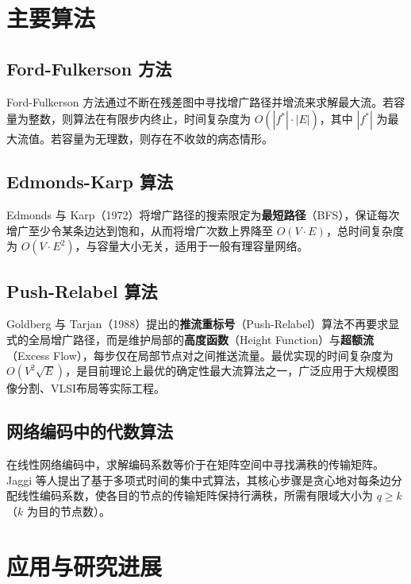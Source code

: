 \documentclass[12pt, a4paper]{article}
\begin{document}
\section{主要算法}

\subsection{Ford-Fulkerson 方法}

Ford-Fulkerson 方法通过不断在残差图中寻找增广路径并增流来求解最大流。若容量为整数，则算法在有限步内终止，时间复杂度为 $O(|f^*|\cdot |E|)$，其中 $|f^*|$ 为最大流值。若容量为无理数，则存在不收敛的病态情形。

\subsection{Edmonds-Karp 算法}

Edmonds 与 Karp（1972）\cite{edmonds1972theoretical}将增广路径的搜索限定为\textbf{最短路径}（BFS），保证每次增广至少令某条边达到饱和，从而将增广次数上界降至 $O(V\cdot E)$，总时间复杂度为 $O(V\cdot E^2)$，与容量大小无关，适用于一般有理容量网络。

\subsection{Push-Relabel 算法}

Goldberg 与 Tarjan（1988）提出的\textbf{推流重标号}（Push-Relabel）算法\cite{goldberg1988new}不再要求显式的全局增广路径，而是维护局部的\textbf{高度函数}（Height Function）与\textbf{超额流}（Excess Flow），每步仅在局部节点对之间推送流量。最优实现的时间复杂度为 $O(V^2\sqrt{E})$，是目前理论上最优的确定性最大流算法之一，广泛应用于大规模图像分割、VLSI布局等实际工程。

\subsection{网络编码中的代数算法}

在线性网络编码中，求解编码系数等价于在矩阵空间中寻找满秩的传输矩阵。Jaggi 等人\cite{jaggi2005polynomial}提出了基于多项式时间的集中式算法，其核心步骤是贪心地对每条边分配线性编码系数，使各目的节点的传输矩阵保持行满秩，所需有限域大小为 $q\geq k$（$k$ 为目的节点数）。

\section{应用与研究进展}
\end{document}
